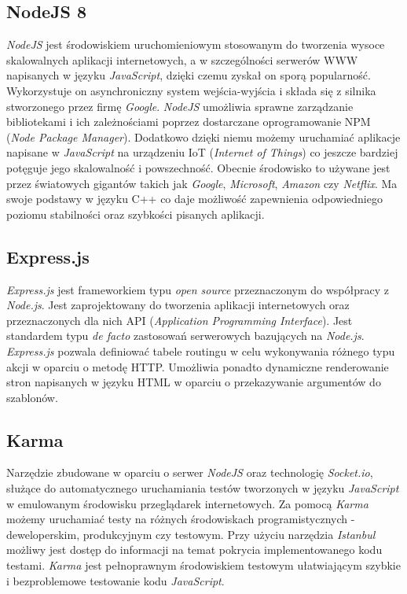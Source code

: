 \subsection{NodeJS 8}
\textit{NodeJS} jest środowiskiem uruchomieniowym stosowanym do tworzenia wysoce skalowalnych aplikacji internetowych, a w szczególności serwerów WWW napisanych w języku \textit{JavaScript}, dzięki czemu zyskał on sporą popularność. Wykorzystuje on asynchroniczny system wejścia-wyjścia i składa się z silnika stworzonego przez firmę \textit{Google}. \textit{NodeJS} umożliwia sprawne zarządzanie bibliotekami i ich zależnościami poprzez dostarczane oprogramowanie NPM (\textit{Node Package Manager}). Dodatkowo dzięki niemu możemy uruchamiać aplikacje napisane w \textit{JavaScript} na urządzeniu IoT (\textit{Internet of Things}) co jeszcze bardziej potęguje jego skalowalność i powszechność. Obecnie środowisko to używane jest przez światowych gigantów takich jak \textit{Google}, \textit{Microsoft}, \textit{Amazon} czy \textit{Netflix}. Ma swoje podstawy w języku C++ co daje możliwość zapewnienia odpowiedniego poziomu stabilności oraz szybkości pisanych aplikacji. 

\subsection{Express.js}
\textit{Express.js} jest frameworkiem typu \textit{open source} przeznaczonym do współpracy z \textit{Node.js}. Jest zaprojektowany do tworzenia aplikacji internetowych oraz przeznaczonych dla nich API (\textit{Application Programming Interface}). Jest standardem typu \textit{de facto} zastosowań serwerowych bazujących na \textit{Node.js}. \textit{Express.js} pozwala definiować tabele routingu w celu wykonywania różnego typu akcji w oparciu o metodę HTTP. Umożliwia ponadto dynamiczne renderowanie stron napisanych w języku HTML w oparciu o przekazywanie argumentów do szablonów. 

\subsection{Karma}
Narzędzie zbudowane w oparciu o serwer \textit{NodeJS} oraz technologię \textit{Socket.io}, służące do automatycznego uruchamiania testów tworzonych w języku \textit{JavaScript} w emulowanym środowisku przeglądarek internetowych. Za pomocą \textit{Karma} możemy uruchamiać testy na różnych środowiskach programistycznych - deweloperskim, produkcyjnym czy testowym. Przy użyciu narzędzia \textit{Istanbul} możliwy jest dostęp do informacji na temat pokrycia implementowanego kodu testami. \textit{Karma} jest pełnoprawnym środowiskiem testowym ułatwiającym szybkie i bezproblemowe testowanie kodu \textit{JavaScript}.

